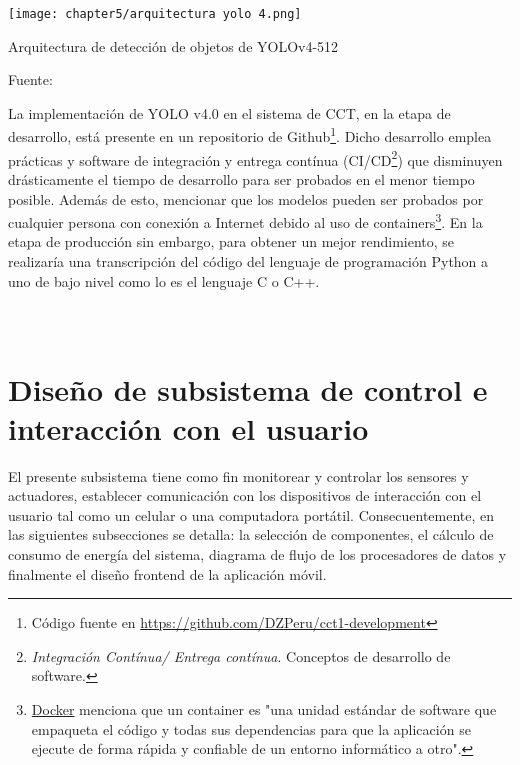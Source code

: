 \begin{myfigure}[H]
	\footnotesize\centering
	\texttt{[image: chapter5/arquitectura yolo 4.png]}
	\caption{Arquitectura de detección de objetos de YOLOv4-512}
	\begin{myflushcenter}
		Fuente: \cite{Solawetz2020}
	\end{myflushcenter}
	\label{fig:arquitectura de deteccion de objetos de YOLOv4-512}
\end{myfigure}

La implementación de YOLO v4.0 en el sistema de CCT, en la etapa de desarrollo, está presente en un repositorio de Github\footnote{ Código fuente en \href{https://github.com/DZPeru/cct1-development}{https://github.com/DZPeru/cct1-development}}. Dicho desarrollo emplea prácticas y software de integración y entrega contínua (CI/CD\footnote{\textit{Integración Contínua/ Entrega contínua}. Conceptos de desarrollo de software.}) que disminuyen drásticamente el tiempo de desarrollo para ser probados en el menor tiempo posible. Además de esto, mencionar que los modelos pueden ser probados por cualquier persona con conexión a Internet debido al uso de containers\footnote{\href{https://www.docker.com/resources/what-container}{Docker} menciona que un container es "una unidad estándar de software que empaqueta el código y todas sus dependencias para que la aplicación se ejecute de forma rápida y confiable de un entorno informático a otro".}. En la etapa de producción sin embargo, para obtener un mejor rendimiento, se realizaría una transcripción del código del lenguaje de programación Python a uno de bajo nivel como lo es el lenguaje C o C++. 


\pagestyle{myportland}
\doublespacing
\chapter[\quad\quad\quad\quad ----- Diseño de subsistema de control e interacción con el usuario]{\\ Diseño de subsistema de control e interacción con el usuario}
\thispagestyle{myportland}
\label{ssec:diseno de subsistema de control e interaccion con el usuario}

El presente subsistema tiene como fin monitorear y controlar los sensores y actuadores, establecer comunicación con los dispositivos de interacción con el usuario tal como un celular o una computadora portátil. Consecuentemente, en las siguientes subsecciones se detalla: la selección de componentes, el cálculo de consumo de energía del sistema, diagrama de flujo de los procesadores de datos y finalmente el diseño frontend de la aplicación móvil.

